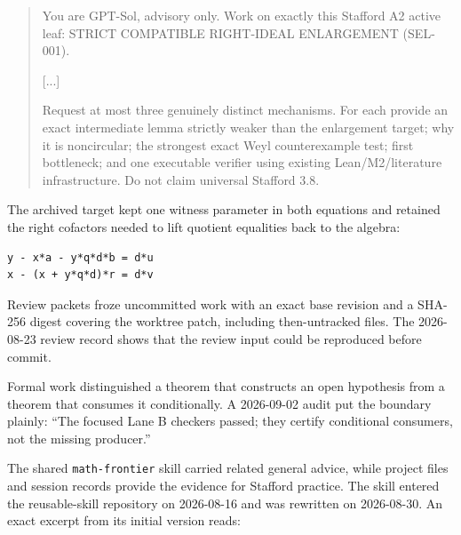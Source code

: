 \begin{quote}\small
You are GPT-Sol, advisory only. Work on exactly this Stafford A2 active leaf:
STRICT COMPATIBLE RIGHT-IDEAL ENLARGEMENT (SEL-001).\par
\medskip
\textnormal{[...]}\par
\medskip
Request at most three genuinely distinct mechanisms. For each provide an
exact intermediate lemma strictly weaker than the enlargement target; why it
is noncircular; the strongest exact Weyl counterexample test; first
bottleneck; and one executable verifier using existing Lean/M2/literature
infrastructure. Do not claim universal Stafford 3.8.
\end{quote}

The archived target kept one witness parameter in both equations and retained
the right cofactors needed to lift quotient equalities back to the algebra:

\begin{verbatim}
y - x*a - y*q*d*b = d*u
x - (x + y*q*d)*r = d*v
\end{verbatim}

Review packets froze uncommitted work with an exact base revision and a
SHA-256 digest covering the worktree patch, including then-untracked files.
The 2026-08-23 review record shows that the review input could be reproduced
before commit.

Formal work distinguished a theorem that constructs an open hypothesis from
a theorem that consumes it conditionally. A 2026-09-02 audit put the boundary
plainly: “The focused Lane B checkers passed; they certify conditional
consumers, not the missing producer.”

The shared \texttt{math-frontier} skill carried related general advice, while
project files and session records provide the evidence for Stafford practice.
The skill entered the reusable-skill repository on 2026-08-16 and was rewritten
on 2026-08-30. An exact excerpt from its initial version reads:

